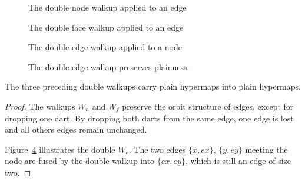 \begin{figure}[htb]
\centering
{}
\caption{The double node walkup applied to an edge}
\label{fig:doublenode}
\end{figure}


\begin{figure}[htb]
\centering
{}
\caption{The double face walkup applied to an edge}
\label{fig:doubleface}
\end{figure}


\begin{figure}[htb]
\centering
{}
\caption{The double edge walkup applied to a node}
\label{fig:doubleedge}
\end{figure}

\begin{figure}[htb]
\centering
{}
\caption{The double edge walkup preserves plainness.}
\label{fig:doubleplain}
\end{figure}


\begin{lemma}  
The three preceding double walkups carry plain
hypermaps into plain hypermaps.
\end{lemma}
%

\begin{proof} The walkups $W_n$ and $W_f$ preserve the orbit structure
of edges, except for dropping one dart.  By dropping both darts from
the same edge, one edge is lost and all others edges remain
unchanged.

Figure~\ref{fig:doubleplain} illustrates the double $W_e$.  The two
edges $\{x,e x\}$, $\{y, e y\}$ meeting the node are fused by the
double walkup into $\{e x, e y\}$, which is still an edge of size
two.
\end{proof}

